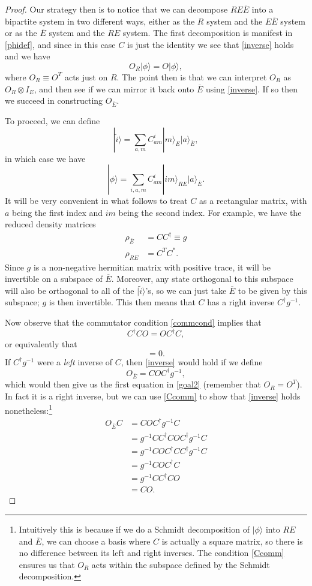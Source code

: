 \documentclass[12pt]{article}
\newcommand{\be}{\begin{equation}}
\newcommand{\ee}{\end{equation}}
\newcommand{\ran}{\rangle}
\newcommand{\wt}{\widetilde}
\newcommand{\ol}{\overline}
\begin{document}
\begin{proof}
Our strategy then is to notice that we can decompose $RE\ol{E}$ into a bipartite system in two different ways, either as the $R$ system and the $ E \ol{E}$ system or as the $\ol{E}$ system and the $RE$ system.  The first decomposition is manifest in \eqref{phidef}, and since in this case $C$ is just the identity we see that \eqref{inverse} holds and we have
\be
O_R|\phi\ran=O|\phi\ran,
\ee
where $O_R\equiv O^T$ acts just on $R$.  The point then is that we can interpret $O_R$ as $O_R\otimes I_E$, and then see if we can mirror it back onto $\ol{E}$ using \eqref{inverse}.  If so then we succeed in constructing $O_{\ol{E}}$.

To proceed, we can define
\be
|\wt{i}\ran=\sum_{a,m}C^{i}_{am}|m\ran_E |a\ran_{\ol{E}},  
\ee
in which case we have
\be
|\phi\ran=\sum_{i,a,m}C^i_{am}|im\ran_{RE}|a\ran_{\ol{E}}.  
\ee
It will be very convenient in what follows to treat $C$ as a rectangular matrix, with $a$ being the first index and $im$ being the second index.  For example, we have the reduced density matrices
\begin{align}\nonumber
\rho_{\ol{E}}&=CC^\dagger\equiv g\\
\rho_{RE}&=C^T C^*.
\end{align}
Since $g$ is a non-negative hermitian matrix with positive trace, it will be invertible on a subspace of $\ol{E}$.  Moreover, any state orthogonal to this subspace will also be orthogonal to all of the $|\wt{i}\ran$'s, so we can just take $\ol{E}$ to be given by this subspace; $g$ is then invertible.  This then means that $C$ has a right inverse $ C^\dagger g^{-1}$.

Now observe that the commutator condition \eqref{commcond} implies that
\be\label{Ccomm}
C^\dagger C O=O C^\dagger C,
\ee
or equivalently that
\be
[O_R\otimes I_E,\rho_{RE}]=0.
\ee
If $C^\dagger g^{-1}$ were a \textit{left} inverse of $C$, then \eqref{inverse} would hold if we define
\be
O_{\ol{E}}=CO C^\dagger g^{-1},
\ee
which would then give us the first equation in \eqref{goal2} (remember that $O_R=O^T$).  In fact it is a right inverse, but we can use \eqref{Ccomm} to show that \eqref{inverse} holds nonetheless:\footnote{Intuitively this is because if we do a Schmidt decomposition of $|\phi\ran$ into $RE$ and $\ol{E}$, we can choose a basis where $C$ is actually a square matrix, so there is no difference between its left and right inverses.  The condition \eqref{Ccomm} ensures us that $O_R$ acts within the subspace defined by the Schmidt decomposition.}
\begin{align}\nonumber
O_{\ol{E}}C&=CO C^\dagger g^{-1} C\\\nonumber
&=g^{-1}CC^\dagger CO C^\dagger g^{-1} C\\\nonumber
&=g^{-1}COC^\dagger C C^\dagger g^{-1} C\\\nonumber
&=g^{-1}COC^\dagger C\\\nonumber
&=g^{-1}CC^\dagger C O\\
&=CO.
\end{align}


\end{proof}
\end{document}

